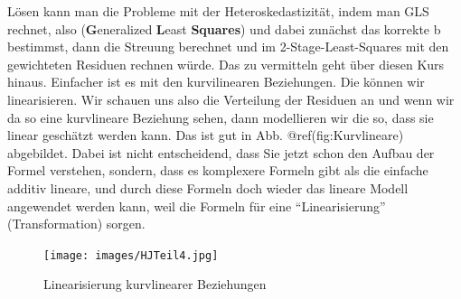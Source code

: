 \documentclass[
  10pt,
  letterpaper,
  a4paper, twoside]{scrreprt}
\begin{document}
Lösen kann man die Probleme mit der Heteroskedastizität, indem man GLS
rechnet, also (\textbf{G}eneralized \textbf{L}east \textbf{Squares}) und
dabei zunächst das korrekte b bestimmst, dann die Streuung berechnet und
im 2-Stage-Least-Squares mit den gewichteten Residuen rechnen würde. Das
zu vermitteln geht über diesen Kurs hinaus. Einfacher ist es mit den
kurvilinearen Beziehungen. Die können wir linearisieren. Wir schauen uns
also die Verteilung der Residuen an und wenn wir da so eine kurvlineare
Beziehung sehen, dann modellieren wir die so, dass sie linear geschätzt
werden kann. Das ist gut in Abb. @ref(fig:Kurvlineare) abgebildet. Dabei
ist nicht entscheidend, dass Sie jetzt schon den Aufbau der Formel
verstehen, sondern, dass es komplexere Formeln gibt als die einfache
additiv lineare, und durch diese Formeln doch wieder das lineare Modell
angewendet werden kann, weil die Formeln für eine
\enquote{Linearisierung} (Transformation) sorgen.

\begin{figure}[H]

{\centering \texttt{[image: images/HJTeil4.jpg]}

}

\caption{Linearisierung kurvlinearer Beziehungen}

\end{figure}%
\end{document}
